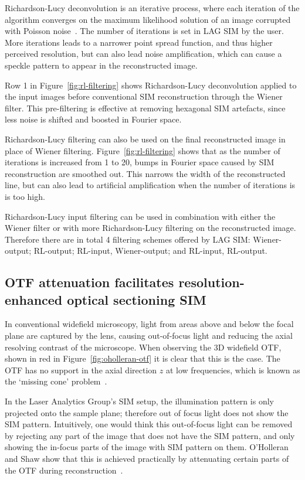 Richardson-Lucy deconvolution is an iterative process, where each iteration of the algorithm converges on the maximum likelihood solution of an image corrupted with Poisson noise~\cite{richardson1972bayesian, lucy1974iterative}. 
The number of iterations is set in LAG SIM by the user.
More iterations leads to a narrower point spread function, and thus higher perceived resolution, but can also lead noise amplification, which can cause a speckle pattern to appear in the reconstructed image.  

Row 1 in Figure~\ref{fig:rl-filtering} shows Richardson-Lucy deconvolution applied to the input images before conventional SIM reconstruction through the Wiener filter. 
This pre-filtering is effective at removing hexagonal SIM artefacts, since less noise is shifted and boosted in Fourier space.

Richardson-Lucy filtering can also be used on the final reconstructed image in place of Wiener filtering. 
Figure~\ref{fig:rl-filtering} shows that as the number of iterations is increased from 1 to 20, bumps in Fourier space caused by SIM reconstruction are smoothed out. 
This narrows the width of the reconstructed line, but can also lead to artificial amplification when the number of iterations is is too high. 

Richardson-Lucy input filtering can be used in combination with either the Wiener filter or with more Richardson-Lucy filtering on the reconstructed image. 
Therefore there are in total 4 filtering schemes offered by LAG SIM: Wiener-output; RL-output; RL-input, Wiener-output; and RL-input, RL-output. 

\subsection{OTF attenuation facilitates resolution-enhanced optical sectioning SIM}
In conventional widefield microscopy, light from areas above and below the focal plane are captured by the lens, causing out-of-focus light and reducing the axial resolving contrast of the microscope. 
When observing the 3D widefield OTF, shown in red in Figure~\ref{fig:oholleran-otf} it is clear that this is the case. 
The OTF has no support in the axial direction $z$ at low frequencies, which is known as the `missing cone' problem~\cite{sheppard1992significance}. 

In the Laser Analytics Group's SIM setup, the illumination pattern is only projected onto the sample plane; therefore out of focus light does not show the SIM pattern.
Intuitively, one would think this out-of-focus light can be removed by rejecting any part of the image that does not have the SIM pattern, and only showing the in-focus parts of the image with SIM pattern on them. 
O'Holleran and Shaw show that this is achieved practically by attenuating certain parts of the OTF during reconstruction~\cite{oholleran2014optimized}.


